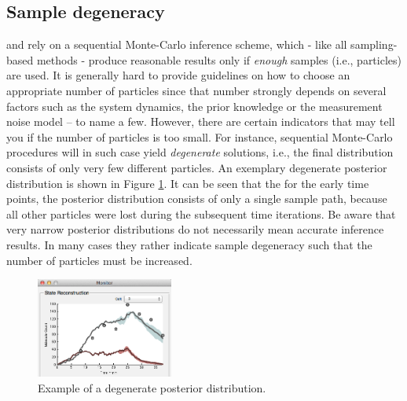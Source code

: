 \documentclass[a4paper, 9pt]{scrartcl}
\begin{document}
\subsection{Sample degeneracy} \label{sec:Degeneracy} \DPP and \GuiDPP rely on a sequential Monte-Carlo inference scheme, which - like all sampling-based methods - produce reasonable results only if \textit{enough} samples (i.e., particles) are used. It is generally hard to provide guidelines on how to choose an appropriate number of particles since that number strongly depends on several factors such as the system dynamics, the prior knowledge or the measurement noise model -- to name a few. However, there are certain indicators that may tell you if the number of particles is too small. For instance, sequential Monte-Carlo procedures will in such case yield \textit{degenerate} solutions, i.e., the final distribution consists of only very few different particles. An exemplary degenerate posterior distribution is shown in Figure \ref{fig:Degeneracy}. It can be seen that the for the early time points, the posterior distribution consists of only a single sample path, because all other particles were lost during the subsequent time iterations. Be aware that very narrow posterior distributions do not necessarily mean accurate inference results. In many cases they rather indicate sample degeneracy such that the number of particles must be increased.


\begin{figure}[htbp]
\begin{center}
	\includegraphics[width=0.4\textwidth]{figures/Doc_Degenaracy}
\caption{Example of a degenerate posterior distribution.}
\label{fig:Degeneracy}
\end{center}
\end{figure}
\end{document}

